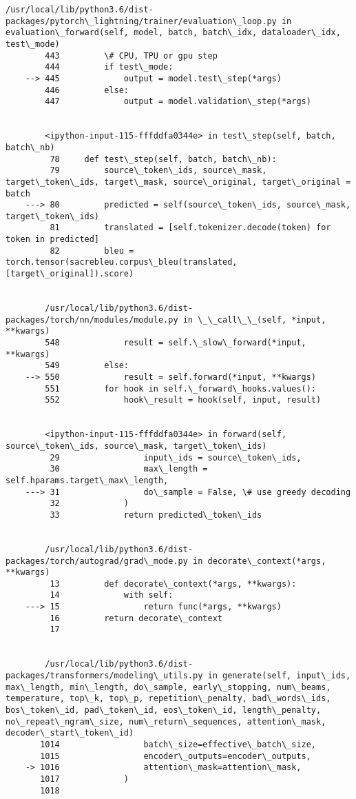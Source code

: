 \documentclass[10pt]{article}
\begin{document}
\begin{Verbatim}[commandchars=\\\{\}]
        /usr/local/lib/python3.6/dist-packages/pytorch\_lightning/trainer/evaluation\_loop.py in evaluation\_forward(self, model, batch, batch\_idx, dataloader\_idx, test\_mode)
        443         \# CPU, TPU or gpu step
        444         if test\_mode:
    --> 445             output = model.test\_step(*args)
        446         else:
        447             output = model.validation\_step(*args)


        <ipython-input-115-fffddfa0344e> in test\_step(self, batch, batch\_nb)
         78     def test\_step(self, batch, batch\_nb):
         79         source\_token\_ids, source\_mask, target\_token\_ids, target\_mask, source\_original, target\_original = batch
    ---> 80         predicted = self(source\_token\_ids, source\_mask, target\_token\_ids)
         81         translated = [self.tokenizer.decode(token) for token in predicted]
         82         bleu = torch.tensor(sacrebleu.corpus\_bleu(translated, [target\_original]).score)


        /usr/local/lib/python3.6/dist-packages/torch/nn/modules/module.py in \_\_call\_\_(self, *input, **kwargs)
        548             result = self.\_slow\_forward(*input, **kwargs)
        549         else:
    --> 550             result = self.forward(*input, **kwargs)
        551         for hook in self.\_forward\_hooks.values():
        552             hook\_result = hook(self, input, result)


        <ipython-input-115-fffddfa0344e> in forward(self, source\_token\_ids, source\_mask, target\_token\_ids)
         29                 input\_ids = source\_token\_ids,
         30                 max\_length = self.hparams.target\_max\_length,
    ---> 31                 do\_sample = False, \# use greedy decoding
         32             )
         33             return predicted\_token\_ids


        /usr/local/lib/python3.6/dist-packages/torch/autograd/grad\_mode.py in decorate\_context(*args, **kwargs)
         13         def decorate\_context(*args, **kwargs):
         14             with self:
    ---> 15                 return func(*args, **kwargs)
         16         return decorate\_context
         17 


        /usr/local/lib/python3.6/dist-packages/transformers/modeling\_utils.py in generate(self, input\_ids, max\_length, min\_length, do\_sample, early\_stopping, num\_beams, temperature, top\_k, top\_p, repetition\_penalty, bad\_words\_ids, bos\_token\_id, pad\_token\_id, eos\_token\_id, length\_penalty, no\_repeat\_ngram\_size, num\_return\_sequences, attention\_mask, decoder\_start\_token\_id)
       1014                 batch\_size=effective\_batch\_size,
       1015                 encoder\_outputs=encoder\_outputs,
    -> 1016                 attention\_mask=attention\_mask,
       1017             )
       1018 



\end{Verbatim}
\end{document}
